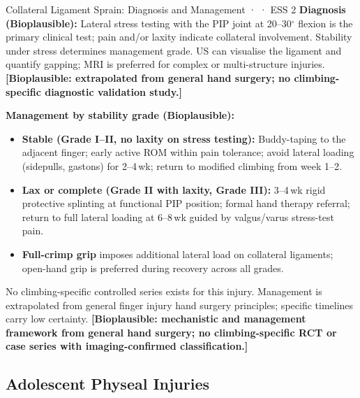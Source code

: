 \begin{bioplausbox}{Collateral Ligament Sprain: Diagnosis and Management · \bioplausible · ESS 2}
\textbf{Diagnosis (Bioplausible):} Lateral stress testing with the PIP joint at 20--30$^\circ$ flexion is the primary clinical test; pain and/or laxity indicate collateral involvement. Stability under stress determines management grade. US can visualise the ligament and quantify gapping; MRI is preferred for complex or multi-structure injuries. \textbf{[Bioplausible: extrapolated from general hand surgery; no climbing-specific diagnostic validation study.]}

\textbf{Management by stability grade (Bioplausible):}
\begin{itemize}[leftmargin=1.5em,noitemsep]
  \item \textbf{Stable (Grade I--II, no laxity on stress testing):} Buddy-taping to the adjacent finger; early active ROM within pain tolerance; avoid lateral loading (sidepulls, gastons) for 2--4\,wk; return to modified climbing from week 1--2.
  \item \textbf{Lax or complete (Grade II with laxity, Grade III):} 3--4\,wk rigid protective splinting at functional PIP position; formal hand therapy referral; return to full lateral loading at 6--8\,wk guided by valgus/varus stress-test pain.
  \item \textbf{Full-crimp grip} imposes additional lateral load on collateral ligaments; open-hand grip is preferred during recovery across all grades.
\end{itemize}
No climbing-specific controlled series exists for this injury. Management is extrapolated from general finger injury hand surgery principles; specific timelines carry low certainty. \textbf{[Bioplausible: mechanistic and management framework from general hand surgery; no climbing-specific RCT or case series with imaging-confirmed classification.]}
\end{bioplausbox}

\subsection{Adolescent Physeal Injuries}
\label{subsec:adolescent}

